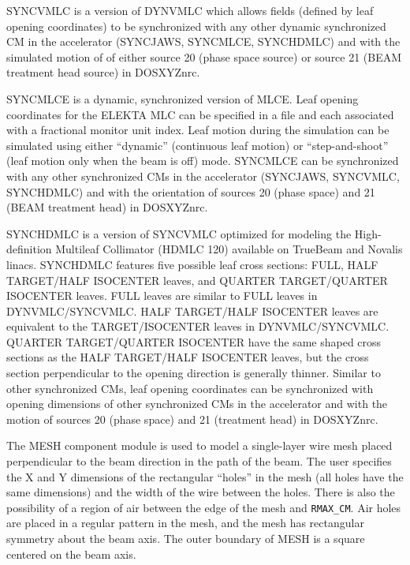 \documentclass[12pt,twoside]{article}
\begin{document}
SYNCVMLC is a version of DYNVMLC which allows fields (defined by leaf opening
coordinates) to be synchronized with any other dynamic synchronized CM in
the accelerator (SYNCJAWS, SYNCMLCE, SYNCHDMLC) and with the simulated motion of
of either source 20 (phase space source) or source 21 (BEAM treatment head source)
in DOSXYZnrc\cite{Wa05}.

SYNCMLCE is a dynamic, synchronized version of MLCE.  Leaf opening coordinates for
the ELEKTA MLC
can be specified in a file and each associated with a fractional monitor
unit index.  Leaf motion during the simulation can be simulated using
either ``dynamic'' (continuous leaf motion) or ``step-and-shoot'' (leaf motion
only when the beam is off) mode.  SYNCMLCE can be synchronized with any
other synchronized CMs in the accelerator (SYNCJAWS, SYNCVMLC, SYNCHDMLC) and
with the orientation of sources 20 (phase space) and 21 (BEAM treatment head) in
DOSXYZnrc\cite{Wa05}.

SYNCHDMLC is a version of SYNCVMLC optimized for modeling the High-definition Multileaf
Collimator (HDMLC 120) available on TrueBeam and Novalis linacs.  SYNCHDMLC features five
possible leaf cross sections: FULL, HALF TARGET/HALF ISOCENTER leaves, and QUARTER TARGET/QUARTER ISOCENTER
leaves.  FULL leaves are similar to FULL leaves in DYNVMLC/SYNCVMLC.  HALF TARGET/HALF ISOCENTER leaves are
equivalent to the TARGET/ISOCENTER leaves in DYNVMLC/SYNCVMLC. QUARTER TARGET/QUARTER ISOCENTER have the
same shaped cross sections as the HALF TARGET/HALF ISOCENTER leaves, but the cross section perpendicular to
the opening direction is generally thinner.  Similar to other synchronized CMs, leaf opening
coordinates can be synchronized with opening dimensions of other synchronized CMs in the accelerator
and with the motion of sources 20 (phase space) and 21 (treatment head) in DOSXYZnrc\cite{Wa05}.

The MESH component module is used to model a single-layer wire mesh placed
perpendicular to the beam direction in the path of the beam.  The user
specifies the X and Y dimensions of the rectangular ``holes'' in the mesh
(all holes have the same dimensions) and the width of the wire between the
holes.  There is also the possibility of a region of air between the edge
of the mesh and \verb+RMAX_CM+.  Air holes are placed in a regular pattern
in the mesh, and the mesh has rectangular symmetry about the beam axis.
The outer boundary of MESH is a square centered on the beam axis.
\end{document}
